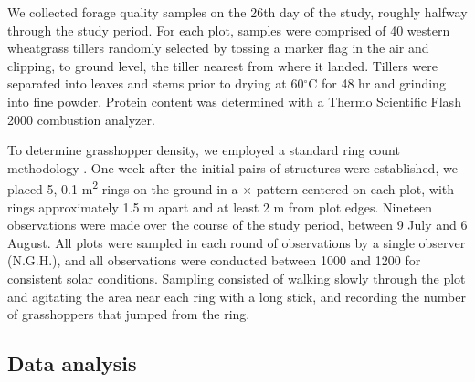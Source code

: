 \documentclass[referee, 
	            sn-basic]
           {sn-jnl}
\begin{document}
\begin{linenumbers}

We collected forage quality samples on the 26th day of the study, roughly halfway through the study period.
For each plot, samples were comprised of 40 western wheatgrass tillers randomly selected by tossing a marker flag in the air and clipping, to ground level, the tiller nearest from where it landed. 
Tillers were  separated into leaves and stems prior to drying at 60$^\circ$C for 48 hr and grinding into fine powder. 
Protein content was determined with a Thermo Scientific Flash 2000 combustion analyzer. 

To determine grasshopper density, we employed a standard ring count methodology
\citep{onsager1977, joern2013}. 
One week after the initial pairs of structures were established, we placed 5, 0.1 m\textsuperscript{2} rings on the ground in a {\large{$\times$}} pattern centered on each plot, with rings approximately 1.5 m apart and at least 2 m from plot edges.
Nineteen observations were made over the course of the study period, between 9 July and 6 August. 
All plots were sampled in each round of observations by a single observer (N.G.H.), and all observations were conducted between 1000 and 1200 for consistent solar conditions. 
Sampling consisted of walking slowly through the plot and agitating the area near each ring with a long stick, and recording the number of grasshoppers that jumped from the ring.

\subsection{Data analysis}


\end{linenumbers}
\end{document}
